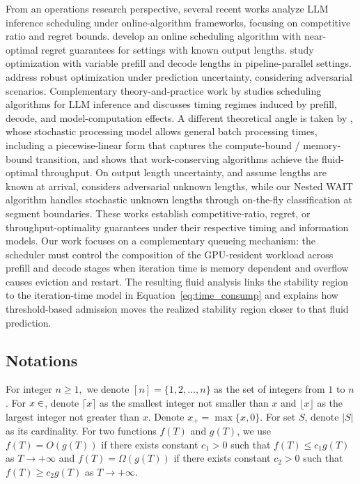 From an operations research perspective, several recent works analyze LLM inference scheduling under online-algorithm frameworks, focusing on competitive ratio and regret bounds. \cite{jaillet2025onlineschedulingllminference} develop an online scheduling algorithm with near-optimal regret guarantees for settings with known output lengths. \cite{wang2025llm} study optimization with variable prefill and decode lengths in pipeline-parallel settings. \cite{chen2025adaptively} address robust optimization under prediction uncertainty, considering adversarial scenarios. Complementary theory-and-practice work by \cite{bari2025optimal} studies scheduling algorithms for LLM inference and discusses timing regimes induced by prefill, decode, and model-computation effects. A different theoretical angle is taken by \cite{li2025throughput}, whose stochastic processing model allows general batch processing times, including a piecewise-linear form that captures the compute-bound / memory-bound transition, and shows that work-conserving algorithms achieve the fluid-optimal throughput. On output length uncertainty, \cite{jaillet2025onlineschedulingllminference} and \cite{wang2025llm} assume lengths are known at arrival, \cite{chen2025adaptively} considers adversarial unknown lengths, while our Nested WAIT algorithm handles stochastic unknown lengths through on-the-fly classification at segment boundaries. These works establish competitive-ratio, regret, or throughput-optimality guarantees under their respective timing and information models. Our work focuses on a complementary queueing mechanism: the scheduler must control the composition of the GPU-resident workload across prefill and decode stages when iteration time is memory dependent and overflow causes eviction and restart. The resulting fluid analysis links the stability region to the iteration-time model in Equation~\eqref{eq:time_consump} and explains how threshold-based admission moves the realized stability region closer to that fluid prediction.


\subsection{Notations}
For integer $n\ge 1,$ we denote $[n]=\{1,2,\dots,n\}$ as the set of integers from $1$ to $n$. For $x\in\real$, denote $\lceil x\rceil$ as the smallest integer not smaller than $x$ and $\lfloor x\rfloor$ as the largest integer not greater than $x$. Denote $x_+=\max\{x, 0\}$. For set $S$, denote $|S|$ as its cardinality. For two functions $f(T)$ and $g(T)$, we use $f(T)=O(g(T))$ if there exists constant $c_1>0$ such that $f(T)\le c_1g(T)$ as $T\to+\infty$ and $f(T)=\Omega(g(T))$ if there exists constant $c_2>0$ such that $f(T)\ge c_2g(T)$ as $T\to +\infty$. 
